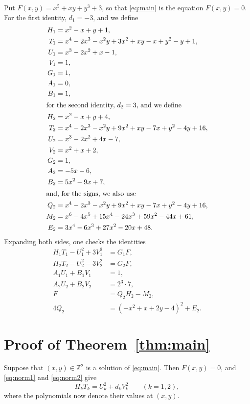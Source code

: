 \documentclass[11pt]{article}
\newcommand{\Z}{\mathbb{Z}}
\begin{document}
Put $F(x,y)=x^{5}+xy+y^{3}+3$, so that \eqref{eq:main} is the equation $F(x,y)=0$.
For the first identity, $d_{1}=-3$, and we define
\begin{align*}
H_{1}&=x^{2}-x+y+1,\\
T_{1}&=x^{4}-2x^{3}-x^{2}y+3x^{2}+xy-x+y^{2}-y+1,\\
U_{1}&=x^{3}-2x^{2}+x-1,\\
V_{1}&=1,\\
G_{1}&=1,\\
A_{1}&=0,\\
B_{1}&=1,\\
\intertext{for the second identity, $d_{2}=3$, and we define}
H_{2}&=x^{2}-x+y+4,\\
T_{2}&=x^{4}-2x^{3}-x^{2}y+9x^{2}+xy-7x+y^{2}-4y+16,\\
U_{2}&=x^{3}-2x^{2}+4x-7,\\
V_{2}&=x^{2}+x+2,\\
G_{2}&=1,\\
A_{2}&=-5x-6,\\
B_{2}&=5x^{2}-9x+7,\\
\intertext{and, for the signs, we also use}
Q_{2}&=x^{4}-2x^{3}-x^{2}y+9x^{2}+xy-7x+y^{2}-4y+16,\\
M_{2}&=x^{6}-4x^{5}+15x^{4}-24x^{3}+59x^{2}-44x+61,\\
E_{2}&=3x^{4}-6x^{3}+27x^{2}-20x+48.
\end{align*}
Expanding both sides, one checks the identities
\begin{align}
H_{1}T_{1}-U_{1}^2+3V_{1}^2&=G_{1}F,\label{eq:norm1}\\
H_{2}T_{2}-U_{2}^2-3V_{2}^2&=G_{2}F,\label{eq:norm2}\\
A_{1}U_{1}+B_{1}V_{1}&=1,\label{eq:bez1}\\
A_{2}U_{2}+B_{2}V_{2}&=2^{3}\cdot 7,\label{eq:bez2}\\
F&=Q_{2}H_{2}-M_{2},\label{eq:sign2}\\
4Q_{2}&=(-x^{2}+x+2y-4)^2+E_{2}.\label{eq:sign2b}
\end{align}

\section{Proof of Theorem~\ref{thm:main}}

Suppose that $(x,y)\in\Z^2$ is a solution of \eqref{eq:main}. Then $F(x,y)=0$, and \eqref{eq:norm1} and \eqref{eq:norm2} give
\begin{equation}\label{eq:HT}
H_kT_k=U_k^2+d_kV_k^2\qquad(k=1,2),
\end{equation}
where the polynomials now denote their values at $(x,y)$.
\end{document}
